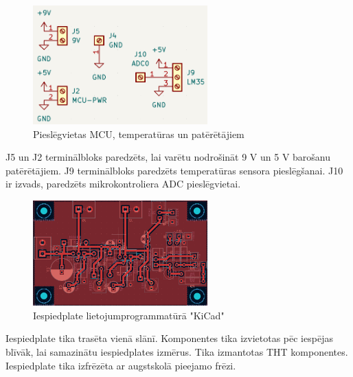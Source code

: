 \begin{figure}[H]
	\centering
    \includegraphics[width=0.6\textwidth]{pictures/outputs.png}\hspace{1cm}
    \caption{Pieslēgvietas MCU, temperatūras un patērētājiem}
\end{figure}
J5 un J2 terminālbloks paredzēts, lai varētu nodrošināt 9 V un 5 V barošanu patērētājiem. J9 terminālbloks paredzēts temperatūras sensora pieslēgšanai. J10 ir izvads, paredzēts mikrokontroliera ADC pieslēgvietai.
\begin{figure}[H]
	\centering
    \includegraphics[width=0.6\textwidth]{pictures/power_board.png}\hspace{1cm}
    \caption{Iespiedplate lietojumprogrammatūrā "KiCad"}
\end{figure}
 Iespiedplate tika trasēta vienā slānī. Komponentes tika izvietotas pēc iespējas blīvāk, lai samazinātu iespiedplates izmērus. Tika izmantotas THT komponentes. Iespiedplate tika izfrēzēta ar augstskolā pieejamo frēzi.
